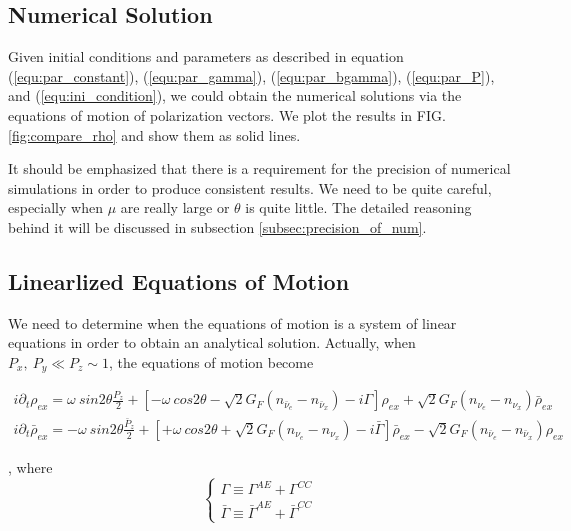 \documentclass[aps,prd,twocolumn,amsmath,amssymb,groupedaddress]{revtex4-2}
\begin{document}
\subsection{\label{subsec:num} Numerical Solution}
Given initial conditions and parameters as described in equation (\ref{equ:par_constant}), (\ref{equ:par_gamma}), (\ref{equ:par_bgamma}), (\ref{equ:par_P}), and (\ref{equ:ini_condition}), we could obtain the numerical solutions via the equations of motion of polarization vectors. We plot the results in FIG. \ref{fig:compare_rho} and show them as solid lines.

It should be emphasized that there is a requirement for the precision of numerical simulations in order to produce consistent results. We need to be quite careful, especially when $\mu$ are really large or $\theta$ is quite little. The detailed reasoning behind it will be discussed in subsection \ref{subsec:precision_of_num}.

\subsection{\label{subsec:linear} Linearlized Equations of Motion}
We need to determine when the equations of motion is a system of linear equations in order to obtain an analytical solution.
Actually, when $P_x, ~P_y \ll P_z \sim 1$, the equations of motion become

\begin{widetext}
\begin{eqnarray}
	i \partial_t \rho_{ex} = \omega ~sin2\theta \frac{P_{z}}{2}
	+\left[-\omega ~cos2\theta-\sqrt{2}G_F(n_{\bar{\nu}_e}-n_{\bar{\nu}_x})- i \Gamma \right]\rho_{ex} + \sqrt{2}G_F(n_{\nu_e}-n_{\nu_x}) \bar{\rho}_{ex}\\
	i \partial_t \bar{\rho}_{ex} = - \omega ~sin2\theta \frac{\bar{P}_{z}}{2} +\left[+\omega ~cos2\theta + \sqrt{2}G_F(n_{\nu_e}-n_{\nu_x}) - i \bar{\Gamma} \right]\bar{\rho}_{ex} -\sqrt{2}G_F(n_{\bar{\nu}_e}-n_{\bar{\nu}_x}) \rho_{ex}
\end{eqnarray}
\end{widetext}
,
where
\begin{equation}
\begin{cases}
	\Gamma \equiv \Gamma^{AE} + \Gamma^{CC}
	\\
	\bar{\Gamma} \equiv \bar{\Gamma}^{AE} + \bar{\Gamma}^{CC}
\end{cases}
\end{equation}
\end{document}
